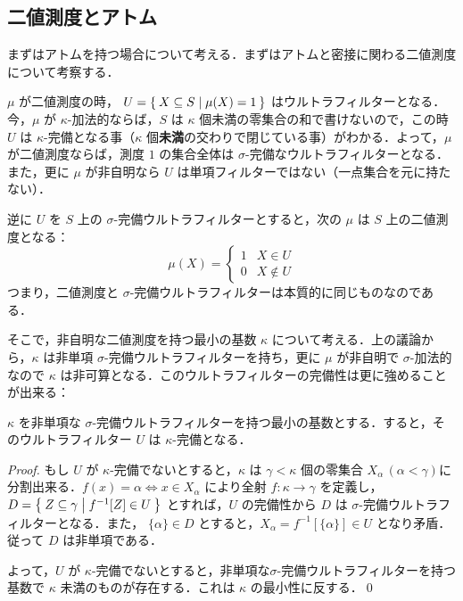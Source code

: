 \documentclass[a4j]{jsarticle}
\begin{document}
\subsection{二値測度とアトム}

まずはアトムを持つ場合について考える．まずはアトムと密接に関わる二値測度について考察する．

$\mu$ が二値測度の時， $U = \Set{ X \subseteq S | \mu(X) = 1}$ はウルトラフィルターとなる．今，$\mu$ が $\kappa$-加法的ならば，$S$ は $\kappa$ 個未満の零集合の和で書けないので，この時 $U$ は $\kappa$-完備となる事（$\kappa$ 個{\bfseries 未満}の交わりで閉じている事）がわかる．よって，$\mu$ が二値測度ならば，測度 $1$ の集合全体は $\sigma$-完備なウルトラフィルターとなる．また，更に $\mu$ が非自明なら $U$ は単項フィルターではない（一点集合を元に持たない）．

逆に $U$ を $S$ 上の $\sigma$-完備ウルトラフィルターとすると，次の $\mu$ は $S$ 上の二値測度となる：
\[
 \mu(X) = \begin{cases}
	   1 & X \in U\\
	   0 & X \notin U
	  \end{cases}
\]
つまり，二値測度と $\sigma$-完備ウルトラフィルターは本質的に同じものなのである．

そこで，非自明な二値測度を持つ最小の基数 $\kappa$ について考える．上の議論から，$\kappa$ は非単項 $\sigma$-完備ウルトラフィルターを持ち，更に $\mu$ が非自明で $\sigma$-加法的なので $\kappa$ は非可算となる．このウルトラフィルターの完備性は更に強めることが出来る：

\begin{lemma}
 \label{Lem:01}
 $\kappa$ を非単項な $\sigma$-完備ウルトラフィルターを持つ最小の基数とする．すると，そのウルトラフィルター $U$ は $\kappa$-完備となる．
\end{lemma}
\begin{proof}
もし $U$ が $\kappa$-完備でないとすると，$\kappa$ は $\gamma < \kappa$ 個の零集合 $X_\alpha\,(\alpha < \gamma)$に分割出来る．$f(x) = \alpha \Leftrightarrow x \in X_\alpha$ により全射 $f: \kappa \to \gamma$ を定義し，$D = \Set{Z \subseteq \gamma | f^{-1}[Z] \in U}$ とすれば，$U$ の完備性から $D$ は $\sigma$-完備ウルトラフィルターとなる．また， $\{\alpha\} \in D$ とすると，$X_\alpha = f^{-1}[\{\alpha\}] \in U$ となり矛盾．従って $D$ は非単項である．

 よって，$U$ が $\kappa$-完備でないとすると，非単項な$\sigma$-完備ウルトラフィルターを持つ基数で $\kappa$ 未満のものが存在する．これは $\kappa$ の最小性に反する．\qed
\end{proof}
\end{document}
